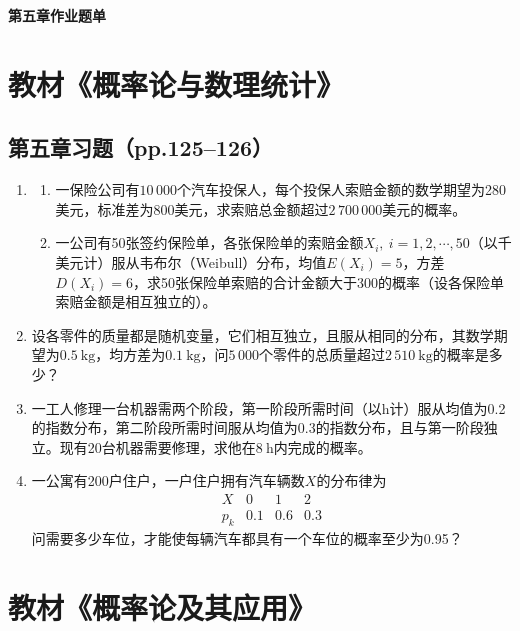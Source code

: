 \documentclass[UTF8]{ctexart}
\begin{document}
\begin{center}
\LARGE\bfseries 第五章作业题单
\end{center}

\section*{教材《概率论与数理统计》}

\subsection*{第五章习题（pp.125--126）}

\begin{enumerate}
\renewcommand{\labelenumi}{\textbf{\arabic{enumi}.}}
\setcounter{enumi}{1}
\item 
\begin{enumerate}
\item[(1)] 一保险公司有$10\,000$个汽车投保人，每个投保人索赔金额的数学期望为280美元，标准差为800美元，求索赔总金额超过$2\,700\,000$美元的概率。
\item[(2)] 一公司有50张签约保险单，各张保险单的索赔金额$X_i,\ i=1,2,\cdots,50$（以千美元计）服从韦布尔（Weibull）分布，均值$E(X_i)=5$，方差$D(X_i)=6$，求50张保险单索赔的合计金额大于300的概率（设各保险单索赔金额是相互独立的）。
\end{enumerate}

\setcounter{enumi}{3}
\item 设各零件的质量都是随机变量，它们相互独立，且服从相同的分布，其数学期望为$0.5\ \mathrm{kg}$，均方差为$0.1\ \mathrm{kg}$，问$5\,000$个零件的总质量超过$2\,510\ \mathrm{kg}$的概率是多少？

\setcounter{enumi}{5}
\item 一工人修理一台机器需两个阶段，第一阶段所需时间（以$\mathrm{h}$计）服从均值为0.2的指数分布，第二阶段所需时间服从均值为0.3的指数分布，且与第一阶段独立。现有20台机器需要修理，求他在$8\ \mathrm{h}$内完成的概率。

\setcounter{enumi}{11}
\item 一公寓有200户住户，一户住户拥有汽车辆数$X$的分布律为
\[
\begin{array}{c|ccc}
X & 0 & 1 & 2\\
\hline
p_k & 0.1 & 0.6 & 0.3
\end{array}
\]
问需要多少车位，才能使每辆汽车都具有一个车位的概率至少为0.95？
\end{enumerate}

\section*{教材《概率论及其应用》}
\end{document}
